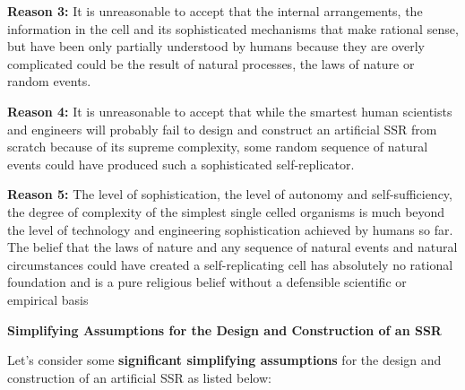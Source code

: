 \documentclass[letterpaper]{article}
\begin{document}
\bigskip

\textbf{Reason 3: } It is unreasonable to accept that the internal
arrangements, the information in the cell and its sophisticated
mechanisms that make rational sense, but have been only partially
understood by humans because they are overly complicated could be the
result of natural processes, the laws of nature or random events.


\bigskip

\textbf{Reason 4:  }It is unreasonable to accept that while the smartest
human scientists and engineers will probably fail to design and
construct an artificial SSR from scratch because of its supreme
complexity, some random sequence of natural events could have produced
such a sophisticated self-replicator.


\bigskip

\textbf{Reason 5:} The level of sophistication, the level of autonomy
and self-sufficiency, the degree of complexity of the simplest single
celled organisms is much beyond the level of technology and engineering
sophistication achieved by humans so far. The belief that the laws of
nature and any sequence of natural events and natural circumstances
could have created a self-replicating cell has absolutely no rational
foundation and is a pure religious belief without a defensible
scientific or empirical basis


\bigskip

{\bfseries
\hypertarget{RefHeading3164306210128}{}Simplifying Assumptions for the
Design and Construction of an SSR}

Let’s consider some \textbf{significant simplifying assumptions} for the
design and construction of an artificial SSR as listed below:


\bigskip
\end{document}
